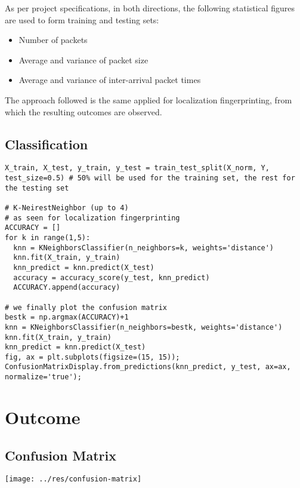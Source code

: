\documentclass[a4paper,11pt]{article} %
\begin{document}
    As per project specifications, in both directions, the following statistical figures are used to form training and testing sets:

    \begin{itemize}
        \item Number of packets
        \item Average and variance of packet size
        \item Average and variance of inter-arrival packet times
    \end{itemize}

    The approach followed is the same applied for localization fingerprinting, from which the resulting outcomes are observed.

    \subsection{Classification}\label{subsec:classification}

    \begin{verbatim}
X_train, X_test, y_train, y_test = train_test_split(X_norm, Y, test_size=0.5) # 50% will be used for the training set, the rest for the testing set

# K-NeirestNeighbor (up to 4)
# as seen for localization fingerprinting
ACCURACY = []
for k in range(1,5):
  knn = KNeighborsClassifier(n_neighbors=k, weights='distance')
  knn.fit(X_train, y_train)
  knn_predict = knn.predict(X_test)
  accuracy = accuracy_score(y_test, knn_predict)
  ACCURACY.append(accuracy)

# we finally plot the confusion matrix
bestk = np.argmax(ACCURACY)+1
knn = KNeighborsClassifier(n_neighbors=bestk, weights='distance')
knn.fit(X_train, y_train)
knn_predict = knn.predict(X_test)
fig, ax = plt.subplots(figsize=(15, 15));
ConfusionMatrixDisplay.from_predictions(knn_predict, y_test, ax=ax, normalize='true');
    \end{verbatim}


    \section{Outcome}\label{sec:outcome}

    \subsection{Confusion Matrix}\label{subsec:confusion-matrix}

    \texttt{[image: ../res/confusion-matrix]}
\end{document}
